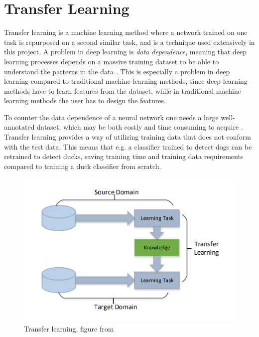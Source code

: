 \section{Transfer Learning}
Transfer learning is a machine learning method where a network trained on one task is repurposed on a second similar task, and is a technique used extensively in this project. A problem in deep learning is \textit{data dependence}, meaning that deep learning processes depends on a massive training dataset to be able to understand the patterns in the data \citep{TransferLearning2}. This is especially a problem in deep learning compared to traditional machine learning methods, since deep learning methods have to learn features from the dataset, while in traditional machine learning methods the user has to design the features. 

\vspace{3mm}

To counter the data dependence of a neural network one needs a large well-annotated dataset, which may be both costly and time consuming to acquire \citep{TransferLearning}. Transfer learning provides a way of utilizing training data that does not conform with the test data. This means that e.g. a classifier trained to detect dogs can be retrained to detect ducks, saving training time and training data requirements compared to training a duck classifier from scratch. 



\begin{figure}[h!]
    \centering
    \includegraphics[scale=0.4]{fig/transfer_learning.png}
    \caption{Transfer learning, figure from \citep{TransferLearning2}}
    \label{fig:transfer_learning}
\end{figure}


